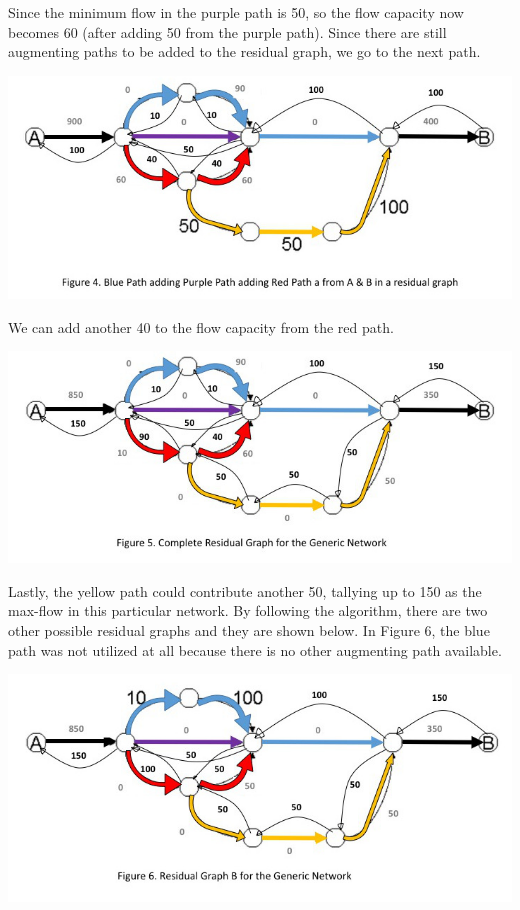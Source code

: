 \documentclass{article}   	                         %
\begin{document}
\begin{enumerate}[(a)]
\begin{center}
\end{center}
Since the minimum flow in the purple path is 50, so the flow capacity now becomes 60 (after adding 50 from the purple path). Since there are still augmenting paths to be added to the residual graph, we go to the next path.
\begin{center}
\includegraphics[scale = 0.45]{slide4.jpg}
\end{center}
We can add another 40 to the flow capacity from the red path. 
\begin{center}
\includegraphics[scale = 0.45]{slide5.jpg}
\end{center}
Lastly, the yellow path could contribute another 50, tallying up to 150 as the max-flow in this particular network.
By following the algorithm, there are two other possible residual graphs and they are shown below. In Figure 6, the blue path was not utilized at all because there is no other augmenting path available. 
\begin{center}
\includegraphics[scale = 0.45]{slide6.jpg}

\end{center}
\end{enumerate}
\end{document}
